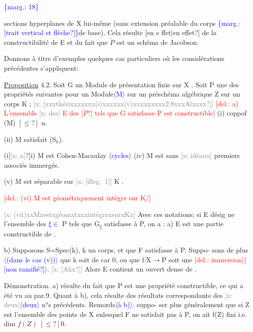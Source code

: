 \documentclass[11pt]{article}
\newcommand{\scanpage}[1]{\par\bigskip\noindent{\small\sffamily[scan #1]}\par}
\newcommand{\mspage}[1]{{\small\sffamily[p.\,#1]}}
\newcommand{\hand}[1]{\textcolor{blue}{#1}}
\let\over\relax
\newcommand{\over}[2]{\textcolor{gray}{#1}\textcolor{blue}{\ensuremath{^{\!\nearrow}}#2}}
\newcommand{\inserted}[2][]{\textcolor{blue}{$\langle$#2$\rangle$}}
\newcommand{\margin}[1]{\textcolor{blue}{\{\textsf{marg.:} #1\}}}
\newcommand{\deleted}[1]{\textcolor{red}{[\textsf{del.:} #1]}}
\newcommand{\xout}[1]{\textcolor{gray}{[\textsf{x:} #1]}}
\newcommand{\uline}[1]{\underline{#1}}
\newcommand{\unsure}[1]{[#1?]}
\newcommand{\illegible}[1]{[\textsf{illeg.\ #1}]}
\begin{document}
\margin{18}

\clearpage
\scanpage{25/19}
\mspage{16}

sections hyperplanes de X lui-même (sans extension préalable du corps
\margin{\unsure{trait vertical et flèche}}de base). Cela résulte \unsure{en e ffet|en effet} de la constructibilité de E et du fait
que $\check{P}$ est un schéma de Jacobson.

Donnons à titre d'exemples quelques cas particuliers où les
considérations précédentes s'appliquent:

\uline{Proposition} 4.2. Soit G un Module de présentation finie sur X .
Soit P une des propriétés suivantes pour un Module\inserted{M} sur un préschéma
algébrique Z sur un corps K ;
\xout{\unsure{xxxthérixxxxxxx(i)xxxxxx(v)xxxxxxxxx2,8xxxAlxxxx}}
\deleted{a) L'ensemble \xout{des} E des \unsure{$\check{P}$} tels que G satisfasse P est
constructible}
(i) coppof (M) $\unsure{\leq}$ n.

(ii) M satisfait (S$_{k}$).

(i\unsure{\xout{x}}i) M est Cohen-Macaulay
\inserted[typed]{cycles}
(iv) M est sans \xout{idéaux} premiers associés immergés.

(v) M est séparable sur \xout{\illegible{1}} K .

\deleted{(vi) M est géométriquement intègre sur K/}

\xout{(vii)xxMxestxgéomxtxxxintègrexsurxKx} Avec ces notations; si E désig%
ne l'ensemble des \hand{$\xi\in$} P tels que G\hand{$_{\xi}$} satisfasse à P, on a :
a) E est une partie constructible de \over{P}{$\check{P}$} .

b) Supposons S=Spec(k), k un corps, et que F satisfasse à P. Suppo-%
sons de plus \inserted{(dans le cas (v))} que k soit de car 0, ou que f:X$\rightarrow$P soit une \deleted{immersion}\inserted{\unsure{non ramifié}}. \xout{\unsure{Akx}}
Alors E contient un ouvert dense de \over{P}{$\check{P}$} .

Démonstration. a) résulte du fait que P est une propriété
constructible, ce qui a été vu au par.9. Quant à b), cela résulte
des résultats correspondants des \xout{deux}\inserted{deux} n$^{o}$s précédents. Remords\inserted{à b)}: suppo-%
ser plus généralement que si Z est l'ensemble des points de X enlesquel%
F ne satisfait pas à P, on ait f(Z) fini i.e. dim $\overline{f(Z)}\;\unsure{\leq}0$.
\end{document}
